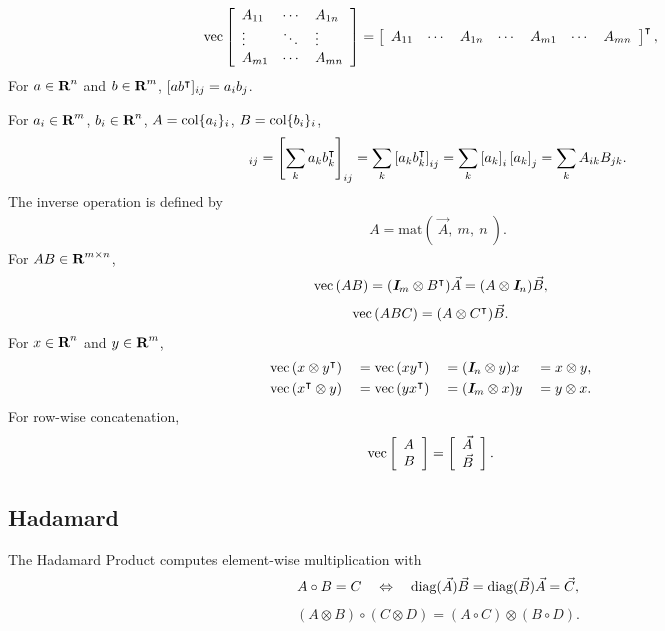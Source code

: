 \documentclass{article}
\begin{document}
    \begin{align*}
        \mathrm{vec}\left[\begin{array}{lllllllllllllllllll} A_{11} & \cdots & A_{1n}
        \\
        \vdots & \ddots & \vdots
        \\
        A_{m1} & \cdots & A_{mn}\end{array}\right]&=\left[\begin{array}{lllllllllllllllllll}A_{11} & \cdots & A_{1n} & \cdots & A_{m1} & \cdots & A_{mn}\end{array}\right]^\intercal,
    \end{align*}
    For $a\in\textbf{R}^n$ and $b\in\textbf{R}^m$, $[ab^\intercal]_{ij} = a_ib_j$.

    For $a_i\in\textbf{R}^m$,
    $b_i\in\textbf{R}^n$, 
    $A=\text{col}\{a_i\}_i$, $B=\text{col}\{b_i\}_i$,
    \begin{align*}
        [AB^\tp]_{ij}
    =\left[\sum_k a_kb_k^\tp\right]_{ij}
        =\sum_k\left[a_kb_k^\tp\right]_{ij}
        = \sum_k \left[a_k\right]_i\left[a_k\right]_j
        = \sum_k A_{ik}B_{jk}.
    \end{align*}
    The inverse operation is defined by
    \begin{align*}
        A = \mathrm{mat}(\:\vec{A},\:m,\:n\:).
    \end{align*}
    For $AB\in\textbf{R}^{m\times n}$,
    \begin{align*}
        \mathrm{vec}\left(AB\right) &= (\emph{\textbf{I}}_m\otimes B^\intercal)\vec{A}
        = (A\otimes \emph{\textbf{I}}_n)\vec{B},
    \end{align*}
    \begin{align*}
        \mathrm{vec}\left(ABC\right) 
        &= (A\otimes C^\intercal)\vec{B}.
    \end{align*}
    For $x\in\textbf{R}^n$ and $y\in\textbf{R}^m$,
    \begin{align*}
        \quad\quad\quad\quad\quad\quad\quad\quad\quad\quad\quad\quad\quad\quad&
        \mathrm{vec}\left(x\otimes y^\intercal\right)
        &
        &=\mathrm{vec}\left(xy^\intercal\right)
        &
        &=(\emph{\textbf{I}}_n\otimes y)x 
        &
        &=x\otimes y,
        &\quad\quad\quad\quad\quad\quad\quad\quad\quad\quad\quad\quad\quad\quad
        \\
        &
        \mathrm{vec}\left(x^\intercal\otimes y\right)
        &
        &=\mathrm{vec}\left(yx^\intercal\right)
        &
        &=(\emph{\textbf{I}}_m\otimes x)y 
        &
        &=y\otimes x.
        & 
    \end{align*}
    For row-wise concatenation,
    \begin{align*}
        \mathrm{vec}\left[\begin{array}{lllllllllllllllllll}A\\B\end{array}\right]&=\left[\begin{array}{lllllllllllllllllll}\vec{A}\\\vec{B}\end{array}\right].
    \end{align*}

    \subsection{Hadamard}
    The Hadamard Product computes element-wise multiplication with
    \begin{align*}
        A \circ B = C\quad \Leftrightarrow \quad \text{diag}(\vec{A})\vec{B}=\text{diag}(\vec{B})\vec{A}=\vec{C},
    \end{align*}
    \begin{align*}
        (A\otimes B)\circ(C\otimes D) = (A\circ C)\otimes (B\circ D).
    \end{align*}
\end{document}
